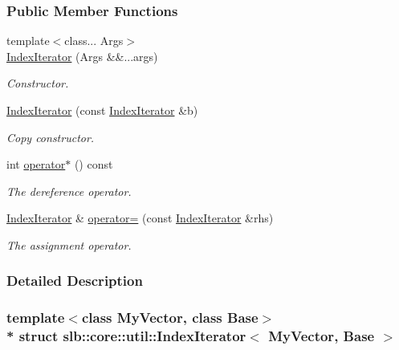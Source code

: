 \subsubsection*{Public Member Functions}
\begin{DoxyCompactItemize}
\item 
{\footnotesize template$<$class... Args$>$ }\\\hyperlink{structslb_1_1core_1_1util_1_1IndexIterator_aa22ada12fb0a5560aabe364f98e6ecbf}{Index\+Iterator} (Args \&\&...args)
\begin{DoxyCompactList}\small\item\em Constructor. \end{DoxyCompactList}\item 
\hyperlink{structslb_1_1core_1_1util_1_1IndexIterator_a51756eb68c0db6afb8271a2170ad3f17}{Index\+Iterator} (const \hyperlink{structslb_1_1core_1_1util_1_1IndexIterator}{Index\+Iterator} \&b)
\begin{DoxyCompactList}\small\item\em Copy constructor. \end{DoxyCompactList}\item 
int \hyperlink{structslb_1_1core_1_1util_1_1IndexIterator_a666a20d111b0cb76f2694332879cc963}{operator$\ast$} () const 
\begin{DoxyCompactList}\small\item\em The dereference operator. \end{DoxyCompactList}\item 
\hyperlink{structslb_1_1core_1_1util_1_1IndexIterator}{Index\+Iterator} \& \hyperlink{structslb_1_1core_1_1util_1_1IndexIterator_aeed92994cbb11d9d4e372895dd138ba2}{operator=} (const \hyperlink{structslb_1_1core_1_1util_1_1IndexIterator}{Index\+Iterator} \&rhs)
\begin{DoxyCompactList}\small\item\em The assignment operator. \end{DoxyCompactList}\end{DoxyCompactItemize}


\subsubsection{Detailed Description}
\subsubsection*{template$<$class My\+Vector, class Base$>$\\*
struct slb\+::core\+::util\+::\+Index\+Iterator$<$ My\+Vector, Base $>$}

